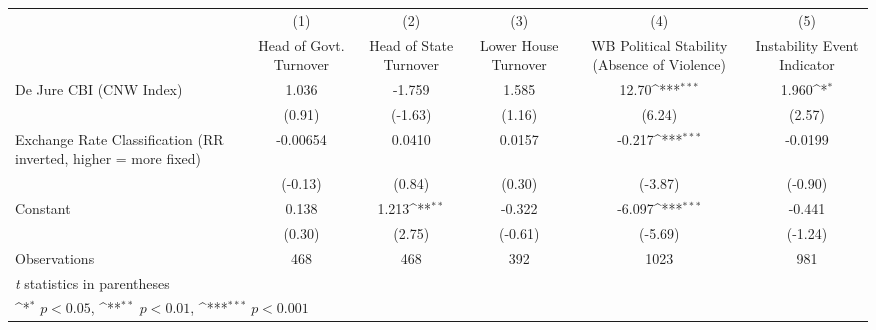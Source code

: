 {
\def\sym#1{\ifmmode^{#1}\else\(^{#1}\)\fi}
\begin{tabular*}{\linewidth}{@{\hskip\tabcolsep\extracolsep\fill}l*{5}{c}}
\hline\hline
                &\multicolumn{1}{c}{(1)}&\multicolumn{1}{c}{(2)}&\multicolumn{1}{c}{(3)}&\multicolumn{1}{c}{(4)}&\multicolumn{1}{c}{(5)}\\
                &\multicolumn{1}{c}{Head of Govt. Turnover}&\multicolumn{1}{c}{Head of State Turnover}&\multicolumn{1}{c}{Lower House Turnover}&\multicolumn{1}{c}{WB Political Stability (Absence of Violence)}&\multicolumn{1}{c}{Instability Event Indicator}\\
\hline
De Jure CBI (CNW Index)&    1.036         &   -1.759         &    1.585         &    12.70\sym{***}&    1.960\sym{*}  \\
                &   (0.91)         &  (-1.63)         &   (1.16)         &   (6.24)         &   (2.57)         \\
[1em]
Exchange Rate Classification (RR inverted, higher = more fixed)& -0.00654         &   0.0410         &   0.0157         &   -0.217\sym{***}&  -0.0199         \\
                &  (-0.13)         &   (0.84)         &   (0.30)         &  (-3.87)         &  (-0.90)         \\
[1em]
Constant        &    0.138         &    1.213\sym{**} &   -0.322         &   -6.097\sym{***}&   -0.441         \\
                &   (0.30)         &   (2.75)         &  (-0.61)         &  (-5.69)         &  (-1.24)         \\
\hline
Observations    &      468         &      468         &      392         &     1023         &      981         \\
\hline\hline
\multicolumn{6}{l}{\footnotesize \textit{t} statistics in parentheses}\\
\multicolumn{6}{l}{\footnotesize \sym{*} \(p<0.05\), \sym{**} \(p<0.01\), \sym{***} \(p<0.001\)}\\
\end{tabular*}
}
